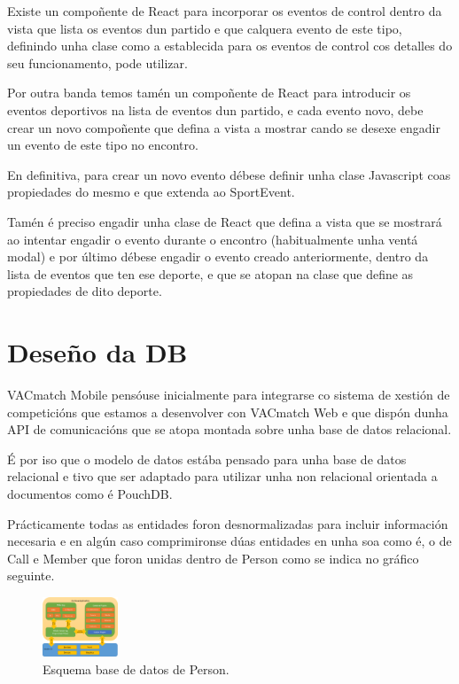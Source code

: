   Existe un compoñente de React para incorporar os eventos de control dentro 
da vista que lista os eventos dun partido e que calquera evento de este tipo, 
definindo unha clase como a establecida para os eventos de control cos detalles 
do seu funcionamento, pode utilizar.

  Por outra banda temos tamén un compoñente de React para introducir os eventos 
deportivos na lista de eventos dun partido, e cada evento novo, debe crear un 
novo compoñente que defina a vista a mostrar cando se desexe engadir un evento 
de este tipo no encontro.

  En definitiva, para crear un novo evento débese definir unha clase Javascript 
coas propiedades do mesmo e que extenda ao SportEvent.

  Tamén é preciso engadir unha clase de React que defina a vista que se 
mostrará ao intentar engadir o evento durante o encontro (habitualmente unha 
ventá modal) e por último débese engadir o evento creado anteriormente, dentro 
da lista de eventos que ten ese deporte, e que se atopan na clase que define as 
propiedades de dito deporte.

  \section{Deseño da DB}
  VACmatch Mobile pensóuse inicialmente para integrarse co sistema de 
xestión de competicións que estamos a desenvolver con VACmatch Web e que dispón 
dunha API de comunicacións que se atopa montada sobre unha base de datos 
relacional.

  É por iso que o modelo de datos estába pensado para unha base de 
datos relacional e tivo que ser adaptado para utilizar unha non relacional 
orientada a documentos como é PouchDB.

  Prácticamente todas as entidades foron desnormalizadas para incluir 
información necesaria e en algún caso comprimironse dúas entidades en unha soa 
como é, o de Call e Member que foron unidas dentro de Person como se indica 
no gráfico seguinte.

    \begin{figure}[h!]
      \begin{center}
      \includegraphics[width=0.2\textwidth]{./img/cordova_arquitectura.png}
      \caption{Esquema base de datos de Person.}
      \end{center}
    \end{figure}

